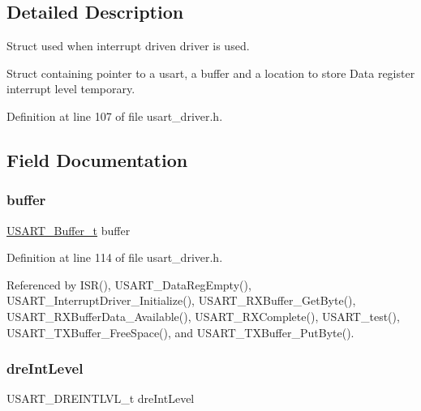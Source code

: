 \subsection{Detailed Description}
Struct used when interrupt driven driver is used. 

Struct containing pointer to a usart, a buffer and a location to store Data register interrupt level temporary. 

Definition at line 107 of file usart\+\_\+driver.\+h.



\subsection{Field Documentation}
\hypertarget{struct_usart__and__buffer_adb062fac585f93e6e48f3d5980e30f22}{}\label{struct_usart__and__buffer_adb062fac585f93e6e48f3d5980e30f22} 
\subsubsection{\texorpdfstring{buffer}{buffer}}
{\footnotesize\ttfamily \hyperlink{usart__driver_8h_af27d135e807dcd1846b6f175997c5f45}{U\+S\+A\+R\+T\+\_\+\+Buffer\+\_\+t} buffer}



Definition at line 114 of file usart\+\_\+driver.\+h.



Referenced by I\+S\+R(), U\+S\+A\+R\+T\+\_\+\+Data\+Reg\+Empty(), U\+S\+A\+R\+T\+\_\+\+Interrupt\+Driver\+\_\+\+Initialize(), U\+S\+A\+R\+T\+\_\+\+R\+X\+Buffer\+\_\+\+Get\+Byte(), U\+S\+A\+R\+T\+\_\+\+R\+X\+Buffer\+Data\+\_\+\+Available(), U\+S\+A\+R\+T\+\_\+\+R\+X\+Complete(), U\+S\+A\+R\+T\+\_\+test(), U\+S\+A\+R\+T\+\_\+\+T\+X\+Buffer\+\_\+\+Free\+Space(), and U\+S\+A\+R\+T\+\_\+\+T\+X\+Buffer\+\_\+\+Put\+Byte().

\hypertarget{struct_usart__and__buffer_ad854f355ca0804e81a03cd57c659da59}{}\label{struct_usart__and__buffer_ad854f355ca0804e81a03cd57c659da59} 
\subsubsection{\texorpdfstring{dre\+Int\+Level}{dreIntLevel}}
{\footnotesize\ttfamily U\+S\+A\+R\+T\+\_\+\+D\+R\+E\+I\+N\+T\+L\+V\+L\+\_\+t dre\+Int\+Level}



